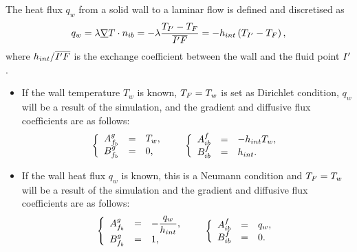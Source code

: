 \begin{example}\label{sec:bndcnd:intro}
The heat flux $q_w$ from a solid wall to a laminar flow is defined and discretised as
\begin{equation}
q_w = \lambda \underline{\nabla} T \cdot n_{ib} = - \lambda \dfrac{T_{I^\prime} -T_F}{ \overline{{I^\prime} F}} = -h_{int} \left(T_{I^\prime} - T_F \right),
\end{equation}
where $h_{int} / \overline{{I^\prime} F}$ is the exchange coefficient between the wall and the fluid point ${I^\prime}$.

\begin{itemize}
\item If the wall temperature $T_w$ is known, $T_F =T_w$ is set as Dirichlet condition, $q_w$
will be a result of the simulation, and the gradient and diffusive flux coefficients
are as follows:
\begin{equation}
\begin{array}{r c l}
\left\lbrace
\begin{array}{r c l}
A^g_{f_{b}} & = & T_w , \\
B^g_{f_{b}} & = & 0,
\end{array}
\right.
 & &
\left\lbrace
\begin{array}{r c l}
A^f_{ib} & = & -h_{int} T_w, \\
B^f_{ib} & = & h_{int}.
\end{array}
\right.
\end{array}
\end{equation}

\item If the wall heat flux $q_w$ is known, this is a Neumann condition and $T_F = T_w$
will be a result of the simulation and the gradient and diffusive flux coefficients
are as follows:
\begin{equation}
\begin{array}{r c l}
\left\lbrace
\begin{array}{r c l}
A^g_{f_{b}} & = & - \dfrac{q_w}{h_{int}} ,\\
B^g_{f_{b}} & = & 1,
\end{array}
\right.
& &
\left\lbrace
\begin{array}{r c l}
A^f_{ib} & = & q_w ,\\
B^f_{ib} & = & 0 .
\end{array}
\right.
\end{array}
\end{equation}

\end{itemize}
\end{example}

